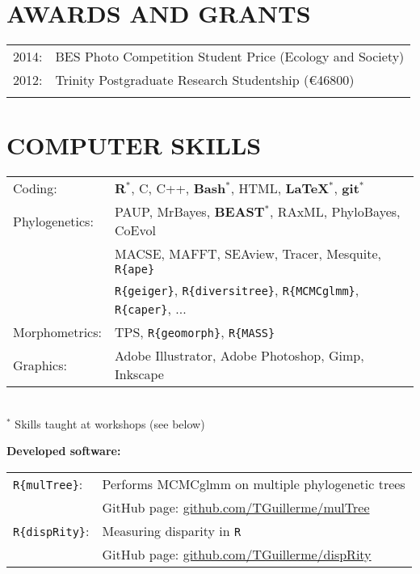 \documentclass[10pt,a4paper]{article}
\begin{document}
{%

\section{AWARDS AND GRANTS}
\begin{tabular}{ll}
2014: & BES Photo Competition Student Price (Ecology and Society)\\
2012: & Trinity Postgraduate Research Studentship (\euro46800)\\
& \\ 
\end{tabular}
\bigskip

\section{COMPUTER SKILLS}
\begin{tabular}{ll}
Coding: & \textbf{{R}$^{*}$}, C, C++, \textbf{Bash$^{*}$}, HTML, \textbf{\LaTeX$^{*}$}, \textbf{git$^{*}$}\\[1.5ex]
Phylogenetics: & PAUP, MrBayes, \textbf{BEAST$^{*}$}, RAxML, PhyloBayes, CoEvol \\
& MACSE, MAFFT, SEAview, Tracer, Mesquite, \texttt{R\{ape\}} \\
& \texttt{R\{geiger\}}, \texttt{R\{diversitree\}}, \texttt{R\{MCMCglmm\}}, \texttt{R\{caper\}}, ... \\[1.5ex]
Morphometrics: & TPS, \texttt{R\{geomorph\}}, \texttt{R\{MASS\}} \\[1.5ex]
Graphics: & Adobe Illustrator, Adobe Photoshop, Gimp, Inkscape\\[1.5ex]
\end{tabular} \\
$^{*}$ Skills taught at workshops (see below)
\bigskip

\raggedright\textbf{Developed software:}\\[1.5ex]
\begin{tabular}{ll}
\texttt{R\{mulTree\}}: & Performs MCMCglmm on multiple phylogenetic trees \\
                       & GitHub page: \href{https://github.com/TGuillerme/mulTree}{github.com/TGuillerme/mulTree} \\
\texttt{R\{dispRity\}}: & Measuring disparity in \texttt{R} \\
                       & GitHub page: \href{https://github.com/TGuillerme/dispRity}{github.com/TGuillerme/dispRity}
\end{tabular} \\


}
\end{document}
